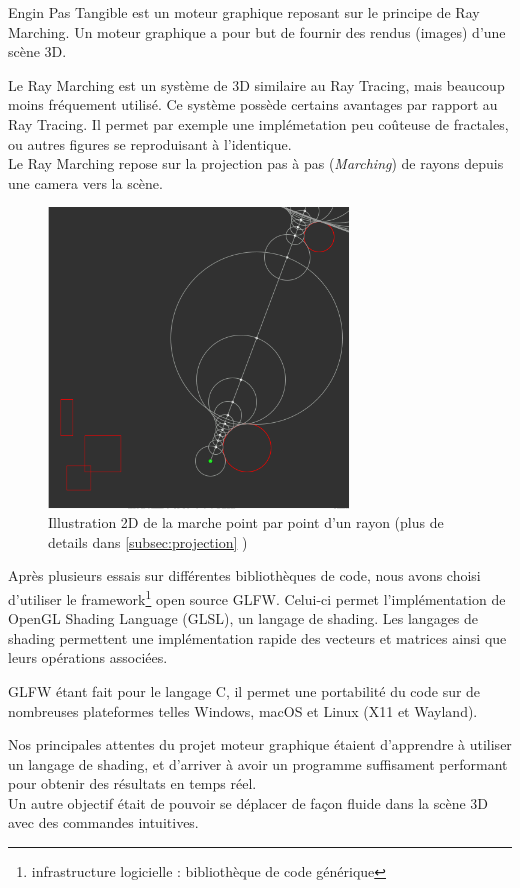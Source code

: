 
Engin Pas Tangible est un moteur graphique reposant sur le principe de Ray Marching. Un moteur graphique a pour but de fournir des rendus (images) d'une scène 3D.\par

Le Ray Marching est un système de 3D similaire au Ray Tracing, mais beaucoup moins fréquement utilisé. Ce système possède certains avantages par rapport au Ray Tracing. 
Il permet par exemple une implémetation peu coûteuse de fractales, ou autres figures se reproduisant à l'identique. \\
Le Ray Marching repose sur la projection pas à pas (\emph{Marching}) de rayons depuis une camera vers la scène.


\begin{figure}[h]
    \centering
    \includegraphics[width=8cm]{images/marching.png}
    \caption{Illustration 2D de la marche point par point d'un rayon (plus de details dans \ref{subsec:projection} )}
    \label{fig:my_label}
\end{figure}

Après plusieurs essais sur différentes bibliothèques de code, nous avons choisi d'utiliser le framework\footnote[1]{infrastructure logicielle : bibliothèque de code générique} open source GLFW. Celui-ci permet l'implémentation de OpenGL Shading Language (GLSL), un langage de shading. Les langages de shading permettent une implémentation rapide des vecteurs et matrices ainsi que leurs opérations associées.\par
GLFW étant fait pour le langage C, il permet une portabilité du code sur de nombreuses plateformes telles Windows, macOS et Linux (X11 et Wayland).\\ \par

Nos principales attentes du projet moteur graphique étaient d'apprendre à utiliser un langage de shading, et d'arriver à avoir un programme suffisament performant pour obtenir des résultats en temps réel. \\
Un autre objectif était de pouvoir se déplacer de façon fluide dans la scène 3D avec des commandes intuitives.